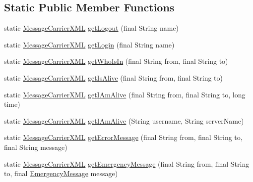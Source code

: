 \subsection*{Static Public Member Functions}
\begin{DoxyCompactItemize}
\item 
static \hyperlink{classgov_1_1fnal_1_1ppd_1_1dd_1_1xml_1_1MessageCarrierXML}{Message\-Carrier\-X\-M\-L} \hyperlink{classgov_1_1fnal_1_1ppd_1_1dd_1_1xml_1_1MessageCarrierXML_ab474605f73570d51cb1e55473aa113ab}{get\-Logout} (final String name)
\item 
static \hyperlink{classgov_1_1fnal_1_1ppd_1_1dd_1_1xml_1_1MessageCarrierXML}{Message\-Carrier\-X\-M\-L} \hyperlink{classgov_1_1fnal_1_1ppd_1_1dd_1_1xml_1_1MessageCarrierXML_aa643242a15c157032471317eb103f2a0}{get\-Login} (final String name)
\item 
static \hyperlink{classgov_1_1fnal_1_1ppd_1_1dd_1_1xml_1_1MessageCarrierXML}{Message\-Carrier\-X\-M\-L} \hyperlink{classgov_1_1fnal_1_1ppd_1_1dd_1_1xml_1_1MessageCarrierXML_aeed287b861456e86a0359707501ee2a8}{get\-Who\-Is\-In} (final String from, final String to)
\item 
static \hyperlink{classgov_1_1fnal_1_1ppd_1_1dd_1_1xml_1_1MessageCarrierXML}{Message\-Carrier\-X\-M\-L} \hyperlink{classgov_1_1fnal_1_1ppd_1_1dd_1_1xml_1_1MessageCarrierXML_aae99eb89f6a79d7f2d12e7b38c07c17d}{get\-Is\-Alive} (final String from, final String to)
\item 
static \hyperlink{classgov_1_1fnal_1_1ppd_1_1dd_1_1xml_1_1MessageCarrierXML}{Message\-Carrier\-X\-M\-L} \hyperlink{classgov_1_1fnal_1_1ppd_1_1dd_1_1xml_1_1MessageCarrierXML_a905ca8052d9b8bb961c6e267c1e0b862}{get\-I\-Am\-Alive} (final String from, final String to, long time)
\item 
static \hyperlink{classgov_1_1fnal_1_1ppd_1_1dd_1_1xml_1_1MessageCarrierXML}{Message\-Carrier\-X\-M\-L} \hyperlink{classgov_1_1fnal_1_1ppd_1_1dd_1_1xml_1_1MessageCarrierXML_a85eb6e5baf2dcc62028b6eadb08715d1}{get\-I\-Am\-Alive} (String username, String server\-Name)
\item 
static \hyperlink{classgov_1_1fnal_1_1ppd_1_1dd_1_1xml_1_1MessageCarrierXML}{Message\-Carrier\-X\-M\-L} \hyperlink{classgov_1_1fnal_1_1ppd_1_1dd_1_1xml_1_1MessageCarrierXML_a5159aef548c8c4fe564adc7d7d622305}{get\-Error\-Message} (final String from, final String to, final String message)
\item 
static \hyperlink{classgov_1_1fnal_1_1ppd_1_1dd_1_1xml_1_1MessageCarrierXML}{Message\-Carrier\-X\-M\-L} \hyperlink{classgov_1_1fnal_1_1ppd_1_1dd_1_1xml_1_1MessageCarrierXML_afc3f785fdcedd57435555287b13cae60}{get\-Emergency\-Message} (final String from, final String to, final \hyperlink{classgov_1_1fnal_1_1ppd_1_1dd_1_1emergency_1_1EmergencyMessage}{Emergency\-Message} message)

\end{DoxyCompactItemize}
